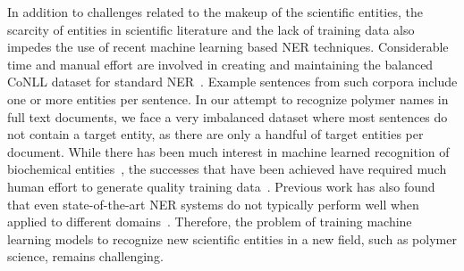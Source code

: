 
In addition to challenges related to the makeup of the scientific entities, the scarcity of entities in scientific literature and the lack of training data also impedes the use of recent machine learning based NER techniques.
Considerable time and manual effort are involved in creating and maintaining the balanced
CoNLL dataset for standard NER~\cite{tjong2003introduction}.
Example sentences from such corpora include one or more entities per sentence. 
In our attempt to recognize polymer names in full text documents, we face a very imbalanced dataset where most sentences do not contain a target entity, as there are only a handful of target entities per document.
While there has been much interest in machine learned recognition of biochemical entities~\cite{jessop2011oscar4,rocktaschel2012chemspot,leaman2015tmchem,swain2016chemdataextractor}, 
the successes that have been achieved have required much human effort to generate quality training data~\cite{krallinger2015chemdner}.
Previous work has also found that even state-of-the-art NER systems do
not typically perform well when applied to different domains~\cite{krallinger2013overview}. 
Therefore, the problem of training machine learning models to recognize new scientific entities in a new field, such as polymer science, remains challenging.



